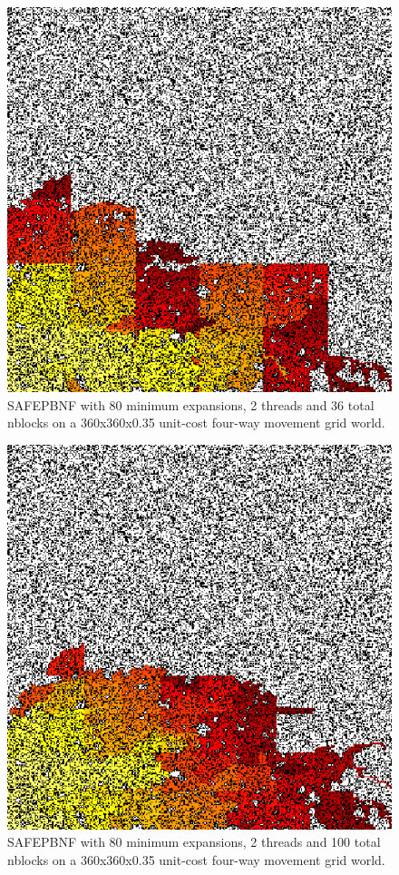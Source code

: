 \documentclass{article}
\begin{document}
\begin{figure}
\includegraphics{safepbnf-80min-2threads-36nblocks-unit-four-035-360-360}
\caption{SAFEPBNF with 80 minimum expansions, 2 threads and 36 total
  nblocks on a 360x360x0.35 unit-cost four-way movement grid world.}
\end{figure}

\begin{figure}
\includegraphics{safepbnf-80min-2threads-100nblocks-unit-four-035-360-360}
\caption{SAFEPBNF with 80 minimum expansions, 2 threads and 100 total
  nblocks on a 360x360x0.35 unit-cost four-way movement grid world.}
\end{figure}
\end{document}

